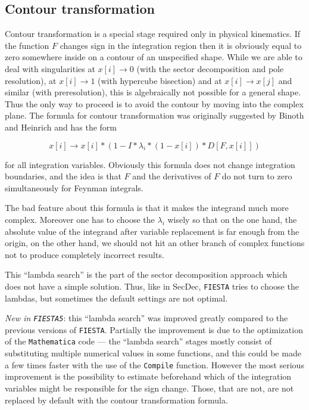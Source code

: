\documentclass[preprint,12pt]{elsarticle}
\begin{document}
\subsection{Contour transformation}

Contour transformation is a special stage required only in physical kinematics. If the function $F$ changes sign in the integration region then it is obviously equal to zero somewhere inside on a contour of an unspecified shape. While we are able to deal with singularities at $x[i] \to 0$ (with the sector decomposition and pole resolution), at $x[i] \to 1$ (with hypercube bisection) and at $x[i] \to x[j]$ and similar (with preresolution), this is algebraically not possible for a general shape. Thus the only way to proceed is to avoid the contour by moving into the complex plane. The formula for contour transformation was originally suggested by Binoth and Heinrich and has the form 

\begin{equation}
x[i] \to x[i] * (1 - I * \lambda_i * (1 - x[i]) * D[F, x[i]]) 
\end{equation}

for all integration variables. Obviously this formula does not change integration boundaries, and the idea is that $F$ and the derivatives of $F$ do not turn to zero simultaneously for Feynman integrals. 

The bad feature about this formula is that it makes the integrand much more complex. Moreover one has to choose the $\lambda_i$ wisely so that on the one hand, the absolute value of the integrand after variable replacement is far enough from the origin, on the other hand, we should not hit an other branch of complex functions not to produce completely incorrect results. 

This ``lambda search'' is the part of the sector decomposition approach which does not have a simple solution. Thus, like in SecDec, {\tt FIESTA} tries to choose the lambdas, but sometimes the default settings are not optimal.

\textit{New in {\tt FIESTA5}}: this ``lambda search'' was improved greatly compared to the previous versions of {\tt FIESTA}. Partially the improvement is due to the optimization of the {\tt Mathematica} code --- the ``lambda search'' stages mostly consist of substituting multiple numerical values in some functions, and this could be made a few times faster with the use of the {\tt Compile} function. However the most serious improvement is the possibility to estimate beforehand which of the integration variables might be responsible for the sign change. Those, that are not, are not replaced by default with the contour transformation formula.
\end{document}
